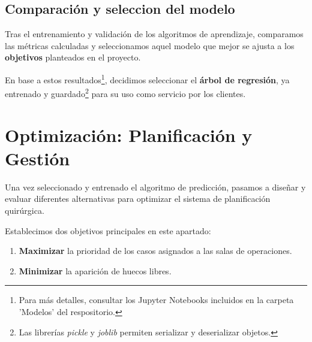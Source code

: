 \subsection{Comparación y seleccion del modelo}

Tras el entrenamiento y validación de los algoritmos de aprendizaje, comparamos las métricas calculadas y seleccionamos aquel modelo que mejor se ajusta a los \textbf{objetivos} planteados en el proyecto.


En base a estos resultados\footnote{Para más detalles, consultar los Jupyter Notebooks incluidos en la carpeta 'Modelos' del respositorio.}, decidimos seleccionar el \textbf{árbol de regresión}, ya entrenado y guardado\footnote{Las librerías \textit{pickle} y \textit{joblib} permiten serializar y deserializar objetos.} para su uso como servicio por los clientes.



\newpage

\section{Optimización: Planificación y Gestión}


Una vez seleccionado y entrenado el algoritmo de predicción, pasamos a diseñar y evaluar diferentes alternativas para optimizar el sistema de planificación quirúrgica.

Establecimos dos objetivos principales en este apartado:
\begin{enumerate}
    \item \textbf{Maximizar} la prioridad de los casos asignados a las salas de operaciones.
    \item \textbf{Minimizar} la aparición de huecos libres.
\end{enumerate}

